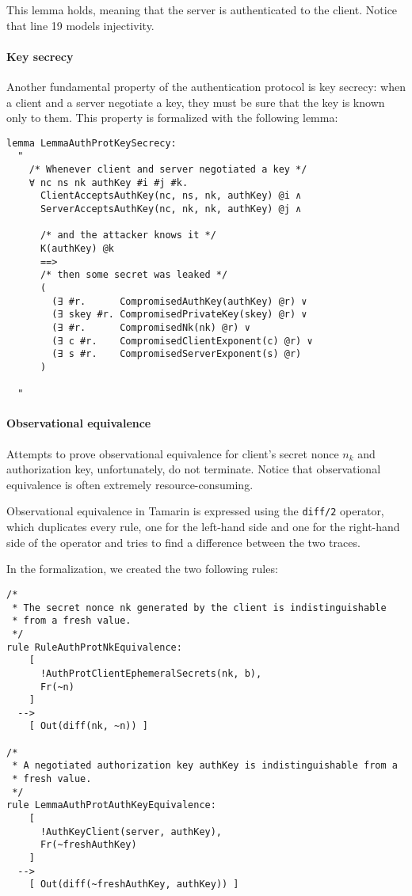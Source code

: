 This lemma holds, meaning that the server is authenticated to the client. Notice that line 19 models injectivity.

\paragraph{Key secrecy}
Another fundamental property of the authentication protocol is key secrecy: when a client and a server negotiate a key, they must be sure that the key is known only to them. This property is formalized with the following lemma:
\begin{lstlisting}
lemma LemmaAuthProtKeySecrecy:
  "
    /* Whenever client and server negotiated a key */
    ∀ nc ns nk authKey #i #j #k.
      ClientAcceptsAuthKey(nc, ns, nk, authKey) @i ∧
      ServerAcceptsAuthKey(nc, nk, nk, authKey) @j ∧

      /* and the attacker knows it */
      K(authKey) @k
      ==>
      /* then some secret was leaked */
      (
        (∃ #r.      CompromisedAuthKey(authKey) @r) ∨
        (∃ skey #r. CompromisedPrivateKey(skey) @r) ∨
        (∃ #r.      CompromisedNk(nk) @r) ∨
        (∃ c #r.    CompromisedClientExponent(c) @r) ∨
        (∃ s #r.    CompromisedServerExponent(s) @r)
      )

  "
\end{lstlisting}

\paragraph{Observational equivalence}
Attempts to prove observational equivalence for client's secret nonce $n_k$ and authorization key, unfortunately, do not terminate. Notice that observational equivalence is often extremely resource-consuming.

Observational equivalence in Tamarin is expressed using the \lstinline{diff/2} operator, which duplicates every rule, one for the left-hand side and one for the right-hand side of the operator and tries to find a difference between the two traces.

In the formalization, we created the two following rules:

\begin{lstlisting}
/*
 * The secret nonce nk generated by the client is indistinguishable 
 * from a fresh value.
 */
rule RuleAuthProtNkEquivalence:
    [
      !AuthProtClientEphemeralSecrets(nk, b),
      Fr(~n)
    ]
  -->
    [ Out(diff(nk, ~n)) ]

/*
 * A negotiated authorization key authKey is indistinguishable from a 
 * fresh value.
 */
rule LemmaAuthProtAuthKeyEquivalence:
    [
      !AuthKeyClient(server, authKey),
      Fr(~freshAuthKey)
    ]
  -->
    [ Out(diff(~freshAuthKey, authKey)) ]
\end{lstlisting}





